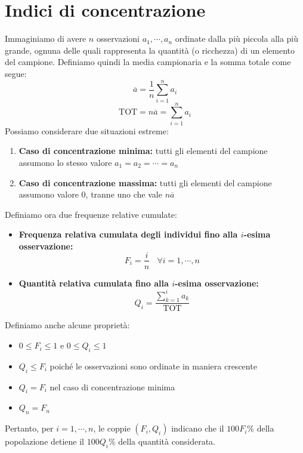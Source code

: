 \documentclass[11pt]{report}
\begin{document}
\section{Indici di concentrazione}
Immaginiamo di avere $n$ osservazioni $a_1, \cdots, a_n$ ordinate dalla più piccola alla più grande, ognuna delle quali rappresenta la quantità (o ricchezza) di un elemento del campione. Definiamo quindi la media campionaria e la somma totale come segue:
\begin{equation}
    \overline{a} = \frac{1}{n} \sum_{i=1}^{n} a_i
\end{equation}
\begin{equation}
    \text{TOT} = n \overline{a} = \sum_{i=1}^{n} a_i
\end{equation}
Possiamo considerare due situazioni estreme:
\begin{enumerate}
    \item \textbf{Caso di concentrazione minima:} tutti gli elementi del campione assumono lo stesso valore $a_1 = a_2 = \cdots = a_n$
    \item \textbf{Caso di concentrazione massima:} tutti gli elementi del campione assumono valore 0, tranne uno che vale $n \overline{a}$
\end{enumerate}
Definiamo ora due frequenze relative cumulate:
\begin{itemize}
    \item \textbf{Frequenza relativa cumulata degli individui fino alla $i$-esima osservazione:}
    \begin{equation}
        F_i = \frac{i}{n}\ \ \ \ \forall i=1, \cdots, n
    \end{equation}
    
    \item \textbf{Quantità relativa cumulata fino alla $i$-esima osservazione:}
    \begin{equation}
        Q_i = \frac{\sum_{k=1}^{i} a_k}{\text{TOT}}
    \end{equation}
\end{itemize}
Definiamo anche alcune proprietà:
\begin{itemize}
    \item $0 \leq F_i \leq 1$ e $0 \leq Q_i \leq 1$
    \item $Q_i \leq F_i$ poiché le osservazioni sono ordinate in maniera crescente
    \item $Q_i = F_i$ nel caso di concentrazione minima
    \item $Q_n = F_n$
\end{itemize}
Pertanto, per $i = 1, \cdots, n$, le coppie $(F_i, Q_i)$ indicano che il $100F_i\%$ della popolazione detiene il $100Q_i\%$ della quantità considerata.
\end{document}
